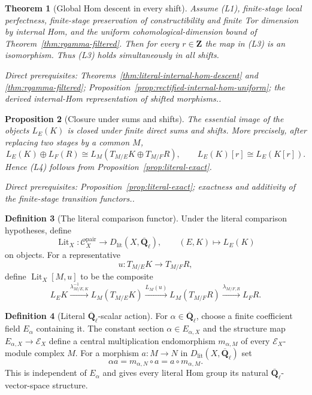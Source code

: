\documentclass[10pt]{article}
\newtheorem{theorem}{Theorem}[section]
\newtheorem{proposition}[theorem]{Proposition}
\theoremstyle{definition}
\newtheorem{definition}[theorem]{Definition}
\newcommand{\Qlb}{\overline{\mathbf Q}_\ell}
\newcommand{\Pair}{\mathcal C_X^{\mathrm{pair}}}
\newcommand{\depends}[1]{\par\smallskip\noindent\textit{Direct prerequisites:} #1.}
\begin{document}
\begin{theorem}[Global Hom descent in every shift]
\label{thm:hom-descent}
Assume (L1), finite-stage local perfectness, finite-stage preservation of
constructibility and finite Tor dimension by internal Hom, and the uniform
cohomological-dimension bound of Theorem~\ref{thm:rgamma-filtered}.  Then
for every $r\in\mathbf Z$ the map in (L3) is an isomorphism.  Thus (L3)
holds simultaneously in all shifts.
\depends{Theorems~\ref{thm:literal-internal-hom-descent} and
\ref{thm:rgamma-filtered};
Proposition~\ref{prop:rectified-internal-hom-uniform}; the derived
internal-Hom representation of shifted morphisms.}
\end{theorem}

\begin{proposition}[Closure under sums and shifts]
\label{prop:literal-basic-closure}
The essential image of the objects $L_E(K)$ is closed under finite direct
sums and shifts.  More precisely, after replacing two stages by a common
$M$,
\[
 L_E(K)\oplus L_F(R)\cong
 L_M(T_{M/E}K\oplus T_{M/F}R),
 \qquad
 L_E(K)[r]\cong L_E(K[r]).
\]
Hence (L4) follows from Proposition~\ref{prop:literal-exact}.
\depends{Proposition~\ref{prop:literal-exact}; exactness and additivity of
the finite-stage transition functors.}
\end{proposition}

\begin{definition}[The literal comparison functor]
\label{def:literal-functor}
Under the literal comparison hypotheses, define
\[
 \operatorname{Lit}_X:\Pair\longrightarrow
 D_{\mathrm{lit}}(X,\Qlb),
 \qquad (E,K)\longmapsto L_E(K)
\]
on objects.  For a representative
\[
 u:T_{M/E}K\longrightarrow T_{M/F}R,
\]
define $\operatorname{Lit}_X[M,u]$ to be the composite
\[
 L_EK\xrightarrow{\lambda_{M/E,K}^{-1}}
 L_M(T_{M/E}K)\xrightarrow{L_M(u)}
 L_M(T_{M/F}R)\xrightarrow{\lambda_{M/F,R}}L_FR.
\]
\end{definition}

\begin{definition}[Literal $\Qlb$-scalar action]
\label{def:literal-scalars}
For $\alpha\in\Qlb$, choose a finite coefficient field $E_\alpha$ containing it.  The
constant section $\alpha\in E_{\alpha,X}$ and the structure map
$E_{\alpha,X}\to\mathcal E_X$ define a central multiplication endomorphism
$m_{\alpha,M}$ of every $\mathcal E_X$-module complex $M$.  For a morphism
$a:M\to N$ in $D_{\mathrm{lit}}(X,\Qlb)$ set
\[
 \alpha a=m_{\alpha,N}\circ a=a\circ m_{\alpha,M}.
\]
This is independent of $E_\alpha$ and gives every literal Hom group its
natural $\Qlb$-vector-space structure.
\end{definition}
\end{document}
